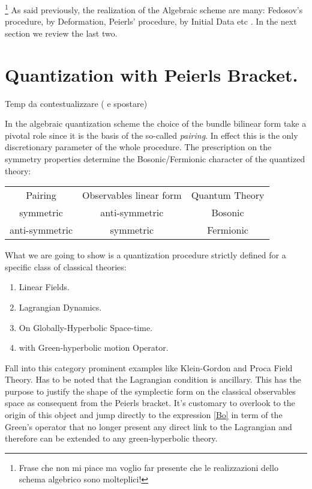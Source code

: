\documentclass[Main]{subfiles}
\begin{document}
\danger\footnote{Frase che non mi piace ma voglio far presente che le realizzazioni dello schema algebrico sono molteplici!}
As said previously, the realization of the Algebraic scheme are many: Fedosov's procedure, by Deformation, Peierls' procedure, by Initial Data etc .
In the next section we review the last two.

\section{Quantization with Peierls Bracket.}
	\danger Temp 		\danger da contestualizzare ( e spostare)
	\begin{observation}
		In the algebraic quantization scheme the choice of the bundle bilinear form take a pivotal role since it is the basis of the so-called \emph{pairing}.
		In effect this is the only discretionary parameter of the whole procedure.
		The prescription on the symmetry properties determine the Bosonic/Fermionic character of the quantized theory:\\
			\begin{tabular}{c c c}
				Pairing & Observables linear form & Quantum Theory\\
				symmetric  & anti-symmetric &  Bosonic \\
				anti-symmetric & symmetric & Fermionic 
			\end{tabular}
	\end{observation}
	\begin{observation}
	
	\end{observation}
	
	What we are going to show is a quantization procedure strictly defined for a specific class of classical theories:
	\begin{enumerate}
		\item Linear Fields.
		\item Lagrangian Dynamics.
		\item On Globally-Hyperbolic Space-time.
		\item with Green-hyperbolic motion Operator.	
	\end{enumerate}
	Fall into this category prominent examples like Klein-Gordon and Proca Field Theory.\cite{Benini}
	Has to be noted that the Lagrangian condition is ancillary. This has the purpose to justify the shape of the symplectic form on the classical observables space as consequent from the Peierls bracket.
	It's customary to overlook to the origin of this object and jump directly to the expression \ref{Bo} in term of the Green's operator that no longer present any direct link to the Lagrangian and therefore can be extended to any green-hyperbolic theory.
	
\end{document}
